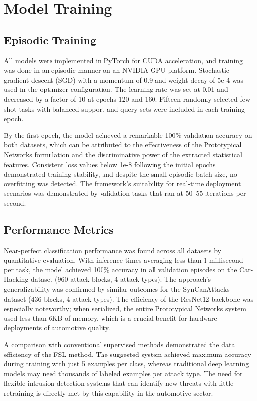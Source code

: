 \section{Model Training}
\subsection{Episodic Training}
All models were implemented in PyTorch for CUDA acceleration, and training was done in an episodic manner on an NVIDIA GPU platform. Stochastic gradient descent (SGD) with a momentum of 0.9 and weight decay of 5e-4 was used in the optimizer configuration. The learning rate was set at 0.01 and decreased by a factor of 10 at epochs 120 and 160. Fifteen randomly selected few-shot tasks with balanced support and query sets were included in each training epoch.

By the first epoch, the model achieved a remarkable 100\% validation accuracy on both datasets, which can be attributed to the effectiveness of the Prototypical Networks formulation and the discriminative power of the extracted statistical features. Consistent loss values below 1e-8 following the initial epochs demonstrated training stability, and despite the small episodic batch size, no overfitting was detected. The framework's suitability for real-time deployment scenarios was demonstrated by validation tasks that ran at 50–55 iterations per second.

\subsection{Performance Metrics}
Near-perfect classification performance was found across all datasets by quantitative evaluation. With inference times averaging less than 1 millisecond per task, the model achieved 100\% accuracy in all validation episodes on the Car-Hacking dataset (960 attack blocks, 4 attack types). The approach's generalizability was confirmed by similar outcomes for the SynCanAttacks dataset (436 blocks, 4 attack types). The efficiency of the ResNet12 backbone was especially noteworthy; when serialized, the entire Prototypical Networks system used less than 6KB of memory, which is a crucial benefit for hardware deployments of automotive quality.

A comparison with conventional supervised methods demonstrated the data efficiency of the FSL method. The suggested system achieved maximum accuracy during training with just 5 examples per class, whereas traditional deep learning models may need thousands of labeled examples per attack type. The need for flexible intrusion detection systems that can identify new threats with little retraining is directly met by this capability in the automotive sector.

